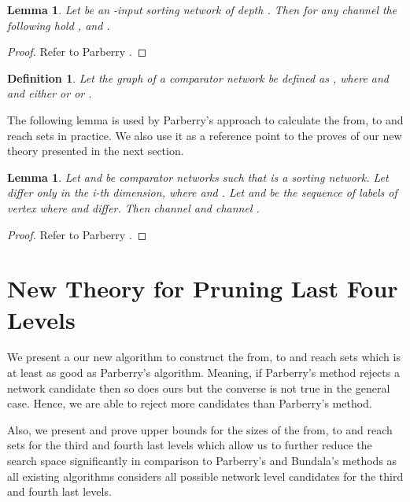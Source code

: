 \documentclass[13pt,a4paper]{article}
\newtheorem{lemma}[theorem]{Lemma}
\newtheorem{definition}[theorem]{Definition}
\begin{document}
\begin{lemma}
\label{lem:reach_2}
Let  be an -input sorting network of depth . Then for any channel  the following hold ,  and .
\end{lemma}

\begin{proof}
Refer to Parberry \cite{Parberry89}.
\end{proof}

\begin{definition}
Let the graph of a comparator network  be defined as , where \newline
   and  \newline
   and either  or  or  .
\end{definition}

The following lemma is used by Parberry's approach to calculate the from, to and reach sets in practice. We also use it as a reference point to the proves of our new theory presented in the next section.

\begin{lemma}
\label{lem:SortableInTwoLevelsParberry}
Let  and  be comparator networks such that  is a sorting network. Let  differ only in the i-th dimension, where  and . Let  and  be the sequence of labels of vertex where  and  differ. Then channel  and channel .
\end{lemma}

\begin{proof}
Refer to Parberry \cite{Parberry89}.
\end{proof}





\section{New Theory for Pruning Last Four Levels}
\label{sec:new:theory}

We present a our new algorithm to construct the from, to and reach sets which is at least as good as Parberry's algorithm. Meaning, if Parberry's method rejects a network candidate then so does ours but the converse is not true in the general case. Hence, we are able to reject more candidates than Parberry's method.

Also, we present and prove upper bounds for the sizes of the from, to and reach sets for the third and fourth last levels which allow us to further reduce the search space significantly in comparison to Parberry's and Bundala's methods as all existing algorithms considers all possible network level candidates for the third and fourth last levels.
\end{document}
